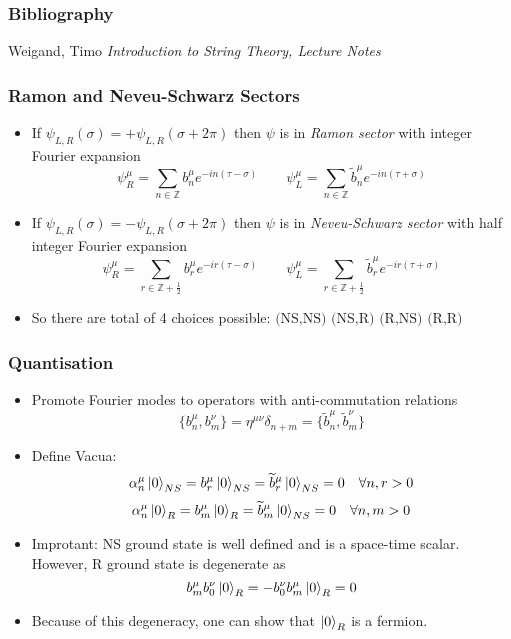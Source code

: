 \documentclass{beamer}
\renewcommand{\tilde}{\widetilde}
\newcommand{\zz}{\mathbb Z}
\begin{document}
\begin{frame}
      \frametitle{Bibliography}
    \begin{thebibliography}{}
      Weigand, Timo
      \textit{Introduction to String Theory, Lecture Notes}\\
    \end{thebibliography}
\end{frame}


\appendix

\begin{frame}
  \frametitle{Ramon and Neveu-Schwarz Sectors}
  \begin{itemize}
  \item If $\psi_{L,R} (\sigma) = + \psi_{L,R}(\sigma+ 2\pi)$ then $\psi$ is in \emph{Ramon sector} with \alert{integer} Fourier expansion
    \[ \psi_{R}^{\mu} = \sum_{n\in \zz}  b_{n}^{\mu} e^{-in(\tau-\sigma)}   
      \qquad \psi_{L}^{\mu} = \sum_{n\in \zz}  \tilde b_{n}^{\mu} e^{-in(\tau+\sigma)}   \]
  \item If $\psi_{L,R} (\sigma) = - \psi_{L,R}(\sigma+ 2\pi)$ then $\psi$ is in \emph{Neveu-Schwarz sector} with \alert{half integer} Fourier expansion
    \[ \psi_{R}^{\mu} = \sum_{r \in \zz+ \frac 12}  b_{r}^{\mu} e^{-ir(\tau-\sigma)}   
      \qquad \psi_{L}^{\mu} = \sum_{r \in \zz+\frac 12}  \tilde b_{r}^{\mu} e^{-ir(\tau+\sigma)}   \]
    
  \item So there are total of 4 choices possible:$\text{ (NS,NS) (NS,R) (R,NS) (R,R)}$
  \end{itemize}
\end{frame}

\begin{frame}
  \frametitle{Quantisation}
  \begin{itemize}
  \item Promote Fourier modes to operators with anti-commutation relations
    \[ \{b^{\mu}_{n}, b^{\nu}_{m}\} = \eta^{\mu\nu} \delta_{n+m} =  \{ \tilde b^{\mu}_{n}, \tilde b^{\nu}_{m}\}  \]
  \item Define Vacua:
    \[ \alpha_{n}^{\mu} \ket 0_{NS} = b^{\mu}_{r} \ket 0_{NS} = \tilde b^{\mu}_{r} \ket 0_{NS} = 0 \quad \forall n,r>0  \]
    \[ \alpha_{n}^{\mu} \ket 0_{R} = b_{m}^{\mu} \ket 0_{R} = \tilde b^{\mu}_{m} \ket 0_{NS} = 0 \quad \forall n,m >0    \]

  \item \alert{Improtant:} NS ground state is well defined and is a space-time scalar. However, R ground state is degenerate as
    \[ b^{\mu}_{m} b^{\nu}_{0} \ket 0 _{R} = - b^{\nu}_{0} b^{\mu}_{m} \ket 0_{R} = 0  \]
  \item Because of this degeneracy, one can show that $\ket 0_{R}$ is a fermion.
    
  \end{itemize}
\end{frame}
\end{document}
